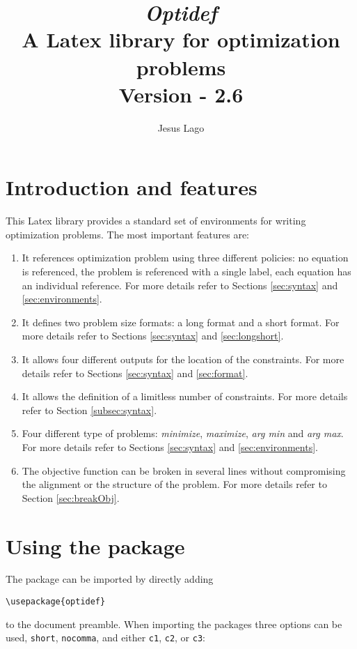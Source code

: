 \documentclass[a4paper]{article}
\title{\textit{\textbf{Optidef}} \\ A Latex library for optimization problems\\ \textnormal{Version - 2.6}}
\author{Jesus Lago}
\begin{document}
\maketitle

\newpage

\tableofcontents

\newpage

\section{Introduction and features}

This Latex library provides a standard set of environments for writing optimization problems. The most important features are:
\begin{enumerate}
\item It references optimization problem using three different policies: no equation is referenced, the problem is referenced with a single label, each equation has an individual reference. For more details refer to Sections \ref{sec:syntax} and \ref{sec:environments}.
\item It defines two problem size formats: a long format and a short format. For more details refer to Sections \ref{sec:syntax} and \ref{sec:longshort}.
\item It allows four different outputs for the location of the constraints. For more details refer to Sections \ref{sec:syntax} and \ref{sec:format}.
\item It allows the definition of a limitless number of constraints. For more details refer to Section \ref{subsec:syntax}.
\item Four different type of problems: \textit{minimize}, \textit{maximize}, \textit{arg min} and \textit{arg max}. For more details refer to Sections \ref{sec:syntax} and \ref{sec:environments}.
\item The objective function can be broken in several lines without compromising the alignment or the structure of the problem. For more details refer to Section \ref{sec:breakObj}.
\end{enumerate}

\section{Using the package}
The package can be imported by directly adding
\begin{lstlisting}
\usepackage{optidef}
\end{lstlisting}
to the document preamble. When importing the packages three options can be used, \verb|short|, \verb|nocomma|, and either \verb|c1|, \verb|c2|, or \verb|c3|:
\end{document}
